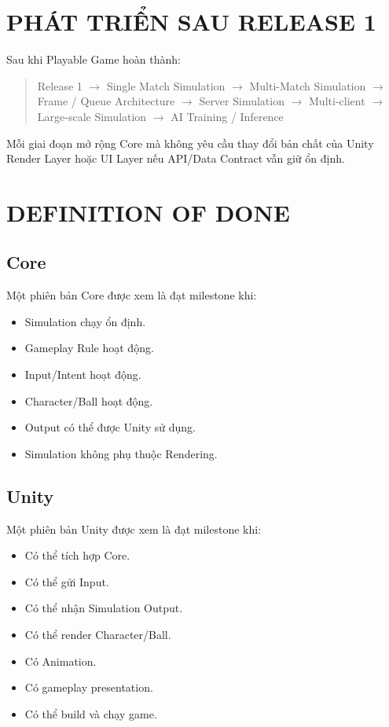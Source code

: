 \documentclass[12pt,a4paper]{article}
\newcommand{\flow}[1]{%
  \begin{quote}\centering\ttfamily #1\end{quote}%
}
\begin{document}
\section{PHÁT TRIỂN SAU RELEASE 1}

Sau khi Playable Game hoàn thành:

\flow{Release 1 $\rightarrow$ Single Match Simulation $\rightarrow$ Multi-Match Simulation $\rightarrow$ Frame / Queue Architecture $\rightarrow$ Server Simulation $\rightarrow$ Multi-client $\rightarrow$ Large-scale Simulation $\rightarrow$ AI Training / Inference}

Mỗi giai đoạn mở rộng Core mà không yêu cầu thay đổi bản chất của Unity Render Layer hoặc UI Layer nếu API/Data Contract vẫn giữ ổn định.

\section{DEFINITION OF DONE}

\subsection*{Core}

Một phiên bản Core được xem là đạt milestone khi:
\begin{itemize}[nosep]
  \item Simulation chạy ổn định.
  \item Gameplay Rule hoạt động.
  \item Input/Intent hoạt động.
  \item Character/Ball hoạt động.
  \item Output có thể được Unity sử dụng.
  \item Simulation không phụ thuộc Rendering.
\end{itemize}

\subsection*{Unity}

Một phiên bản Unity được xem là đạt milestone khi:
\begin{itemize}[nosep]
  \item Có thể tích hợp Core.
  \item Có thể gửi Input.
  \item Có thể nhận Simulation Output.
  \item Có thể render Character/Ball.
  \item Có Animation.
  \item Có gameplay presentation.
  \item Có thể build và chạy game.
\end{itemize}
\end{document}
